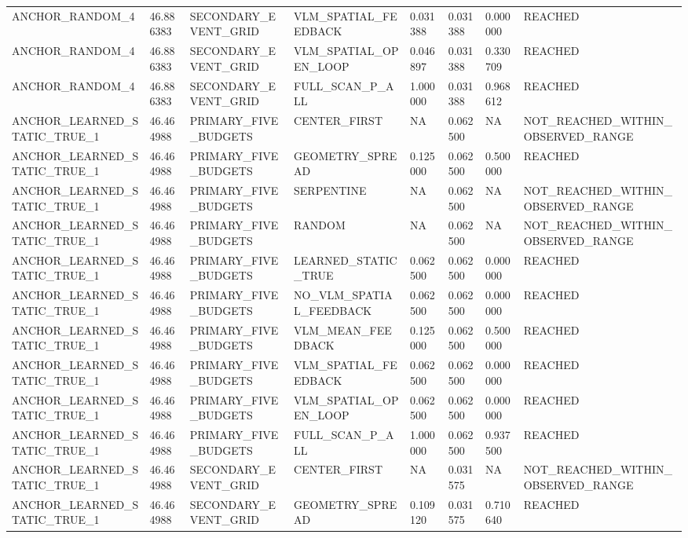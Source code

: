 \begin{tabular}{llllllll}
ANCHOR\_RANDOM\_4 & 46.886383 & SECONDARY\_EVENT\_GRID & VLM\_SPATIAL\_FEEDBACK & 0.031388 & 0.031388 & 0.000000 & REACHED \\
ANCHOR\_RANDOM\_4 & 46.886383 & SECONDARY\_EVENT\_GRID & VLM\_SPATIAL\_OPEN\_LOOP & 0.046897 & 0.031388 & 0.330709 & REACHED \\
ANCHOR\_RANDOM\_4 & 46.886383 & SECONDARY\_EVENT\_GRID & FULL\_SCAN\_P\_ALL & 1.000000 & 0.031388 & 0.968612 & REACHED \\
ANCHOR\_LEARNED\_STATIC\_TRUE\_1 & 46.464988 & PRIMARY\_FIVE\_BUDGETS & CENTER\_FIRST & NA & 0.062500 & NA & NOT\_REACHED\_WITHIN\_OBSERVED\_RANGE \\
ANCHOR\_LEARNED\_STATIC\_TRUE\_1 & 46.464988 & PRIMARY\_FIVE\_BUDGETS & GEOMETRY\_SPREAD & 0.125000 & 0.062500 & 0.500000 & REACHED \\
ANCHOR\_LEARNED\_STATIC\_TRUE\_1 & 46.464988 & PRIMARY\_FIVE\_BUDGETS & SERPENTINE & NA & 0.062500 & NA & NOT\_REACHED\_WITHIN\_OBSERVED\_RANGE \\
ANCHOR\_LEARNED\_STATIC\_TRUE\_1 & 46.464988 & PRIMARY\_FIVE\_BUDGETS & RANDOM & NA & 0.062500 & NA & NOT\_REACHED\_WITHIN\_OBSERVED\_RANGE \\
ANCHOR\_LEARNED\_STATIC\_TRUE\_1 & 46.464988 & PRIMARY\_FIVE\_BUDGETS & LEARNED\_STATIC\_TRUE & 0.062500 & 0.062500 & 0.000000 & REACHED \\
ANCHOR\_LEARNED\_STATIC\_TRUE\_1 & 46.464988 & PRIMARY\_FIVE\_BUDGETS & NO\_VLM\_SPATIAL\_FEEDBACK & 0.062500 & 0.062500 & 0.000000 & REACHED \\
ANCHOR\_LEARNED\_STATIC\_TRUE\_1 & 46.464988 & PRIMARY\_FIVE\_BUDGETS & VLM\_MEAN\_FEEDBACK & 0.125000 & 0.062500 & 0.500000 & REACHED \\
ANCHOR\_LEARNED\_STATIC\_TRUE\_1 & 46.464988 & PRIMARY\_FIVE\_BUDGETS & VLM\_SPATIAL\_FEEDBACK & 0.062500 & 0.062500 & 0.000000 & REACHED \\
ANCHOR\_LEARNED\_STATIC\_TRUE\_1 & 46.464988 & PRIMARY\_FIVE\_BUDGETS & VLM\_SPATIAL\_OPEN\_LOOP & 0.062500 & 0.062500 & 0.000000 & REACHED \\
ANCHOR\_LEARNED\_STATIC\_TRUE\_1 & 46.464988 & PRIMARY\_FIVE\_BUDGETS & FULL\_SCAN\_P\_ALL & 1.000000 & 0.062500 & 0.937500 & REACHED \\
ANCHOR\_LEARNED\_STATIC\_TRUE\_1 & 46.464988 & SECONDARY\_EVENT\_GRID & CENTER\_FIRST & NA & 0.031575 & NA & NOT\_REACHED\_WITHIN\_OBSERVED\_RANGE \\
ANCHOR\_LEARNED\_STATIC\_TRUE\_1 & 46.464988 & SECONDARY\_EVENT\_GRID & GEOMETRY\_SPREAD & 0.109120 & 0.031575 & 0.710640 & REACHED \\

\end{tabular}
